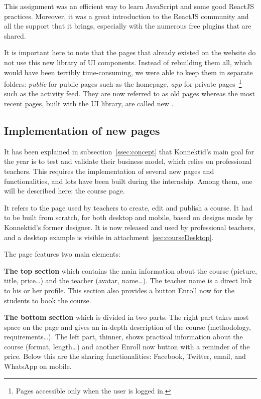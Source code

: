 This assignment was an efficient way to learn JavaScript and some good ReactJS practices. Moreover, it was a great introduction to the ReactJS community and all the support that it brings, especially with the numerous free plugins that are shared.

It is important here to note that the pages that already existed on the website do not use this new library of UI components. Instead of rebuilding them all, which would have been terribly time-consuming, we were able to keep them in separate folders: \textit{public} for public pages such as the homepage, \textit{app} for private pages~\footnote{Pages accessible only when the user is logged in.} such as the activity feed. They are now referred to as \guillemotleft{} old \guillemotright{} pages whereas the most recent pages, built with the UI library, are called \guillemotleft{} new \guillemotright{}.

\subsection{Implementation of new pages}
\label{ssec:new_pages}

It has been explained in {\sc subsection}~\ref{ssec:concept} that Konnektid's main goal for the year is to test and validate their business model, which relies on
professional teachers. This requires the implementation of several new pages and functionalities, and lots have been built during the internship. Among them, one will be described here: the course page.

It refers to the page used by teachers to create, edit and publish a course. It had to be built from scratch, for both desktop and mobile, based on designs
made by Konnektid's former designer. It is now released and used by professional teachers, and a desktop example is visible in {\sc attachment}~\ref{sec:courseDesktop}.

The page features two main elements:

\textbf{The top section} which contains the main information about the course (picture, title, price\ldots) and the teacher (avatar, name\ldots).
The teacher name is a direct link to his or her profile. This section also provides a button \guillemotleft{} Enroll now \guillemotright{} for the students to book the course.

\textbf{The bottom section} which is divided in two parts. The right part takes most space on the page and gives an in-depth description of the course
(methodology, requirements\ldots). The left part, thinner, shows practical information about the course (format, length\ldots) and another \guillemotleft{} Enroll now \guillemotright{} button with a reminder of the price. Below this are the sharing functionalities: Facebook, Twitter,
email, and WhatsApp on mobile.

